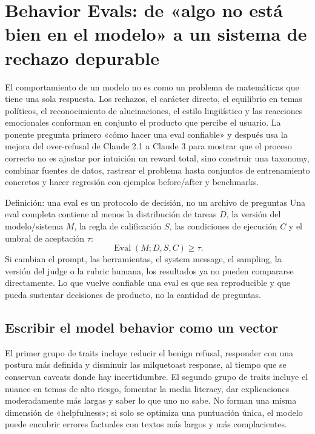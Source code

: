 \section{Behavior Evals: de «algo no está bien en el modelo» a un sistema de rechazo depurable}

El comportamiento de un modelo no es como un problema de matemáticas que tiene una sola respuesta. Los rechazos, el carácter directo, el equilibrio en temas políticos, el reconocimiento de alucinaciones, el estilo lingüístico y las reacciones emocionales conforman en conjunto el producto que percibe el usuario. La ponente pregunta primero «cómo hacer una eval confiable» y después usa la mejora del over-refusal de Claude 2.1 a Claude 3 para mostrar que el proceso correcto no es ajustar por intuición un reward total, sino construir una taxonomy, combinar fuentes de datos, rastrear el problema hasta conjuntos de entrenamiento concretos y hacer regresión con ejemplos before/after y benchmarks.


\begin{importantbox}{Definición: una eval es un protocolo de decisión, no un archivo de preguntas}
Una eval completa contiene al menos la distribución de tareas $D$, la versión del modelo/sistema $M$, la regla de calificación $S$, las condiciones de ejecución $C$ y el umbral de aceptación $\tau$:
\[
\operatorname{Eval}(M;D,S,C)\ge \tau.
\]
Si cambian el prompt, las herramientas, el system message, el sampling, la versión del judge o la rubric humana, los resultados ya no pueden compararse directamente. Lo que vuelve confiable una eval es que sea reproducible y que pueda sustentar decisiones de producto, no la cantidad de preguntas.
\end{importantbox}

\subsection{Escribir el model behavior como un vector}

El primer grupo de traits incluye reducir el benign refusal, responder con una postura más definida y disminuir las milquetoast response, al tiempo que se conservan caveats donde hay incertidumbre. El segundo grupo de traits incluye el nuance en temas de alto riesgo, fomentar la media literacy, dar explicaciones moderadamente más largas y saber lo que uno no sabe. No forman una misma dimensión de «helpfulness»; si solo se optimiza una puntuación única, el modelo puede encubrir errores factuales con textos más largos y más complacientes.

